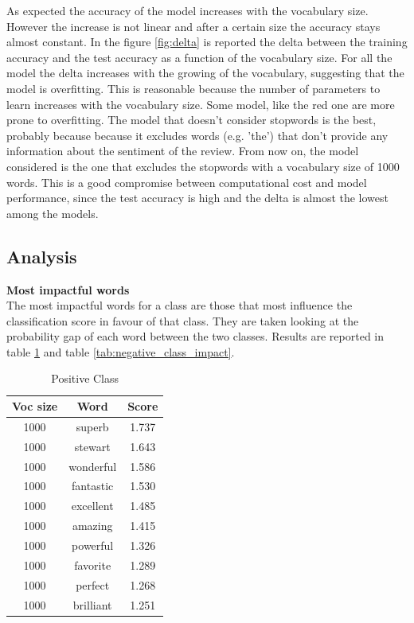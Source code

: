\documentclass{article}
\begin{document}
\begin{multicols}{2}
\noindent
As expected the accuracy of the model increases with the vocabulary size. However the increase is not linear and after a certain size the accuracy
stays almost constant. In the figure \ref{fig:delta} is reported the delta between the training accuracy and the test accuracy as a function of the vocabulary size.
For all the model the delta increases with the growing of the vocabulary, suggesting that the model is overfitting. This is reasonable because the number of
parameters to learn increases with the vocabulary size. Some model, like the red one are more prone to overfitting.
The model that doesn't consider stopwords is the best, probably because because it excludes words (e.g. 'the') 
that don't provide any information about the sentiment of the review. From now on, the model considered is the one that excludes the stopwords with a vocabulary
size of 1000 words. This is a good compromise between computational cost and model performance, since the test accuracy is high and the delta is almost the 
lowest among the models.\\


\subsection{Analysis}
\textbf{Most impactful words}\\
The most impactful words for a class are those that most influence the classification score in favour of that class. They are taken looking at the probability
gap of each word between the two classes.
Results are reported in table \ref{tab:positive_class_impact} and table \ref{tab:negative_class_impact}.



    \begin{table}[H]
        \centering
        \small
        \caption{\small Positive Class}
        \label{tab:positive_class_impact}
        \begin{tabular}{ |c|c|c| } 
        \hline
        \textbf{Voc size} & \textbf{Word} & \textbf{Score} \\ \hline
        1000 & superb & 1.737 \\ \hline
        1000 & stewart & 1.643 \\ \hline
        1000 & wonderful & 1.586 \\ \hline
        1000 & fantastic & 1.530 \\ \hline
        1000 & excellent & 1.485 \\ \hline
        1000 & amazing & 1.415 \\ \hline
        1000 & powerful & 1.326 \\ \hline
        1000 & favorite & 1.289 \\ \hline
        1000 & perfect & 1.268 \\ \hline
        1000 & brilliant & 1.251 \\ \hline
        \end{tabular}
    \end{table}



\end{multicols}
\end{document}
